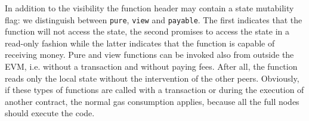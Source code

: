 In addition to the visibility the function header may contain a state mutability
flag: we distinguish between \texttt{pure}, \texttt{view} and \texttt{payable}. 
The first indicates that the function will not access the state, the second
promises to access the state in a read-only fashion while the latter indicates 
that the function is capable of receiving money.
Pure and view functions can be invoked also from outside the EVM, i.e. without
a transaction and without paying fees. After all, the function reads only the
local state without the intervention of the other peers.
Obviously, if these types of functions are called with a transaction or during
the execution of another contract, the normal gas consumption applies, because
all the full nodes should execute the code.




